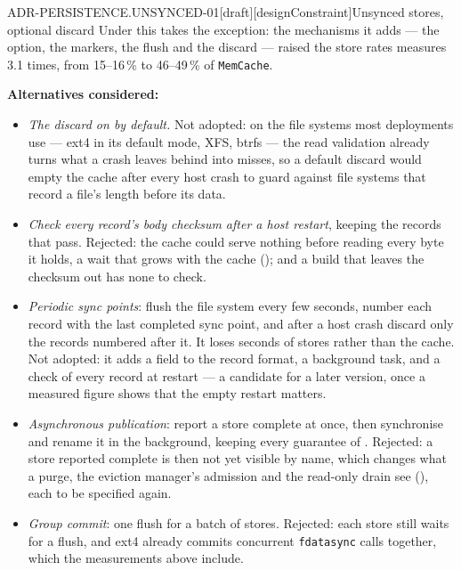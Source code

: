 \begin{requirement}{ADR-PERSISTENCE.UNSYNCED-01}[draft][designConstraint]{Unsynced stores, optional discard}
  Under  this takes the exception: the mechanisms it
  adds --- the option, the markers, the flush and the discard --- raised the
  store rates  measures 3.1 times, from
  15--16\,\% to 46--49\,\% of \texttt{MemCache}.

  \textbf{Alternatives considered:}
  \begin{itemize}
    \item \emph{The discard on by default.} Not adopted: on the file systems
      most deployments use --- ext4 in its default mode, XFS, btrfs --- the
      read validation already turns what a crash leaves behind into misses,
      so a default discard would empty the cache after every host crash to
      guard against file systems that record a file's length before its
      data.
    \item \emph{Check every record's body checksum after a host restart},
      keeping the records that pass. Rejected: the cache could serve nothing
      before reading every byte it holds, a wait that grows with the cache
      (); and a build that leaves the
      checksum out has none to check.
    \item \emph{Periodic sync points}: flush the file system every few
      seconds, number each record with the last completed sync point, and
      after a host crash discard only the records numbered after it. It loses
      seconds of stores rather than the cache. Not adopted: it adds a field to
      the record format, a background task, and a check of every record at
      restart --- a candidate for a later version, once a measured figure
      shows that the empty restart matters.
    \item \emph{Asynchronous publication}: report a store complete at once,
      then synchronise and rename it in the background, keeping every
      guarantee of . Rejected: a store
      reported complete is then not yet visible by name, which changes what a
      purge, the eviction manager's admission and the read-only drain see
      (), each to be specified again.
    \item \emph{Group commit}: one flush for a batch of stores. Rejected: each
      store still waits for a flush, and ext4 already commits concurrent
      \texttt{fdatasync} calls together, which the measurements above
      include.
  \end{itemize}


\end{requirement}
